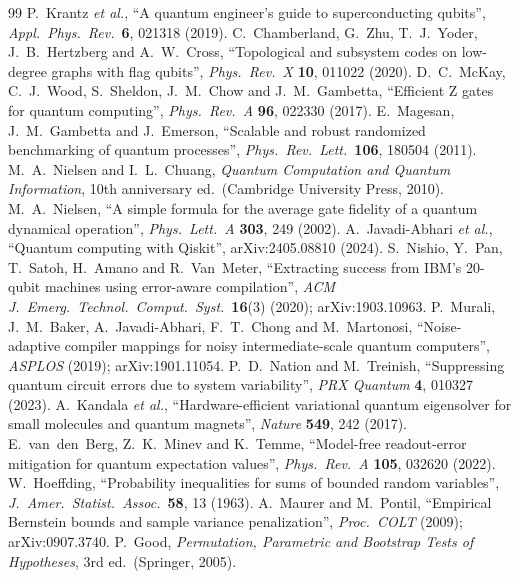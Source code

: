 \documentclass[10pt,a4paper]{article}
\begin{document}
\begin{thebibliography}{99}
 P.~Krantz \emph{et al.}, ``A quantum engineer's guide to superconducting qubits'', \emph{Appl.\ Phys.\ Rev.}\ \textbf{6}, 021318 (2019).
 C.~Chamberland, G.~Zhu, T.~J.~Yoder, J.~B.~Hertzberg and A.~W.~Cross, ``Topological and subsystem codes on low-degree graphs with flag qubits'', \emph{Phys.\ Rev.\ X} \textbf{10}, 011022 (2020).
 D.~C.~McKay, C.~J.~Wood, S.~Sheldon, J.~M.~Chow and J.~M.~Gambetta, ``Efficient Z gates for quantum computing'', \emph{Phys.\ Rev.\ A} \textbf{96}, 022330 (2017).
 E.~Magesan, J.~M.~Gambetta and J.~Emerson, ``Scalable and robust randomized benchmarking of quantum processes'', \emph{Phys.\ Rev.\ Lett.}\ \textbf{106}, 180504 (2011).
 M.~A.~Nielsen and I.~L.~Chuang, \emph{Quantum Computation and Quantum Information}, 10th anniversary ed.\ (Cambridge University Press, 2010).
 M.~A.~Nielsen, ``A simple formula for the average gate fidelity of a quantum dynamical operation'', \emph{Phys.\ Lett.\ A} \textbf{303}, 249 (2002).
 A.~Javadi-Abhari \emph{et al.}, ``Quantum computing with Qiskit'', arXiv:2405.08810 (2024).
 S.~Nishio, Y.~Pan, T.~Satoh, H.~Amano and R.~Van~Meter, ``Extracting success from IBM's 20-qubit machines using error-aware compilation'', \emph{ACM J.\ Emerg.\ Technol.\ Comput.\ Syst.}\ \textbf{16}(3) (2020); arXiv:1903.10963.
 P.~Murali, J.~M.~Baker, A.~Javadi-Abhari, F.~T.~Chong and M.~Martonosi, ``Noise-adaptive compiler mappings for noisy intermediate-scale quantum computers'', \emph{ASPLOS} (2019); arXiv:1901.11054.
 P.~D.~Nation and M.~Treinish, ``Suppressing quantum circuit errors due to system variability'', \emph{PRX Quantum} \textbf{4}, 010327 (2023).
 A.~Kandala \emph{et al.}, ``Hardware-efficient variational quantum eigensolver for small molecules and quantum magnets'', \emph{Nature} \textbf{549}, 242 (2017).
 E.~van~den~Berg, Z.~K.~Minev and K.~Temme, ``Model-free readout-error mitigation for quantum expectation values'', \emph{Phys.\ Rev.\ A} \textbf{105}, 032620 (2022).
 W.~Hoeffding, ``Probability inequalities for sums of bounded random variables'', \emph{J.\ Amer.\ Statist.\ Assoc.}\ \textbf{58}, 13 (1963).
 A.~Maurer and M.~Pontil, ``Empirical Bernstein bounds and sample variance penalization'', \emph{Proc.\ COLT} (2009); arXiv:0907.3740.
 P.~Good, \emph{Permutation, Parametric and Bootstrap Tests of Hypotheses}, 3rd ed.\ (Springer, 2005).

\end{thebibliography}
\end{document}
